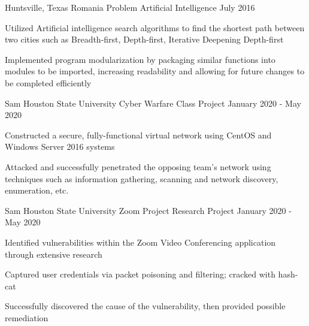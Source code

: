 
\begin{cventries}
	\cventry
	  {Huntsville, Texas} %
      {Romania Problem} %
	  {Artificial Intelligence} %
	  {July 2016} %
	  {
	    \begin{cvitems} %
			\item {Utilized Artificial intelligence search algorithms to find the shortest path between two cities such as Breadth-first, Depth-first, Iterative Deepening Depth-first}
			\item{Implemented program modularization by packaging similar functions into modules to be imported, increasing readability and allowing for future changes to be completed efficiently}				
		\end{cvitems}
	  }


	\cventry
	  {Sam Houston State University} %
  	  {Cyber Warfare} %
	  {Class Project} %
	  {January 2020 - May 2020} %
	  {
	    \begin{cvitems} %
			\item {Constructed a secure, fully-functional virtual network using CentOS and Windows Server 2016 systems}
			\item {Attacked and successfully penetrated the opposing team’s network using techniques such as information gathering, scanning and network discovery, enumeration, etc.}
		\end{cvitems}
	  }

	\cventry
	  {Sam Houston State University} %
      {Zoom Project} %
	  {Research Project} %
	  {January 2020 - May 2020} %
	  {
	    \begin{cvitems} %
			\item {Identified vulnerabilities within the Zoom Video Conferencing application through extensive research}
			\item {Captured user credentials via packet poisoning and filtering; cracked with hash-cat}
			\item {Successfully discovered the cause of the vulnerability, then provided possible remediation }
		\end{cvitems}
	  }


\end{cventries}
